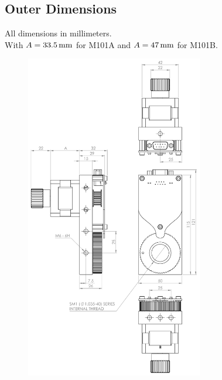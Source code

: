 \documentclass[a4paper, final, 12pt, oneside]{scrartcl}
\numberwithin{equation}{section}
\numberwithin{table}{section}
\numberwithin{figure}{section}
\begin{document}
\subsection*{Outer Dimensions}
All dimensions in millimeters.\\
With $A = \unit[33.5]{mm}$ for M101A and $A = \unit[47]{mm}$ for M101B.
\begin{figure}[!htp]
  \centering
  \includegraphics[angle=0,origin=c,width=0.69\textwidth]{./drawings/M101_outline_dimensions.pdf}
\end{figure}
\FloatBarrier
\end{document}
